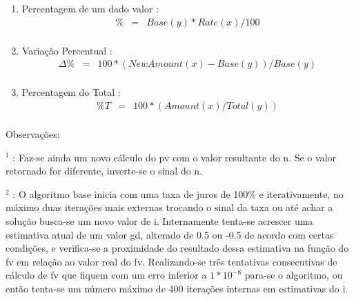 \begin{enumerate}

\item Percentagem de um dado valor \cite{man1}:
\begin{eqnarray*}
 	\% &=& Base(y) * Rate(x) / 100 \\	
\end{eqnarray*}

\item Variação Percentual \cite{man1}:
\begin{eqnarray*}
 	\Delta\% &=& 100*(NewAmount(x)-Base(y))/Base(y) \\	
\end{eqnarray*}

\item Percentagem do Total \cite{man1}:
\begin{eqnarray*}
 	\%T &=& 100*(Amount(x)/Total(y)) \\	
\end{eqnarray*}

\end{enumerate}

Observações: 

$ ^{1} $ : Faz-se ainda um novo cálculo do pv com o valor resultante do n. Se o valor retornado for diferente, inverte-se o sinal do n.

$ ^{2} $ : O algoritmo base inicia com uma taxa de juros de 100\% e iterativamente, no máximo duas iterações mais externas trocando o sinal da taxa ou até achar a solução busca-se um novo valor de i. Internamente tenta-se acrescer uma estimativa atual de um valor gd, alterado de 0.5 ou -0.5 de acordo com certas condições, e verifica-se a proximidade do resultado dessa estimativa na função do fv em relação ao valor real do fv. Realizando-se três tentativas consecutivas de cálculo de fv que fiquem com um erro inferior a $ 1 * 10^{-8} $ para-se o algoritmo, ou então tenta-se um número máximo de 400 iterações internas em estimativas do i.